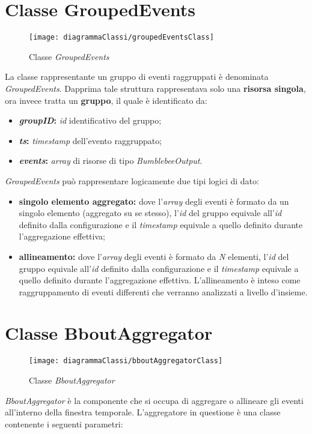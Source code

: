 \section{Classe GroupedEvents}\label{sec:ge}
\begin{figure}[H] 
    \centering 
    \texttt{[image: diagrammaClassi/groupedEventsClass]} 
    \caption{Classe \textit{GroupedEvents}}
\end{figure}
La classe rappresentante un gruppo di eventi raggruppati è denominata \textit{GroupedEvents}. Dapprima tale struttura rappresentava solo una \textbf{risorsa singola}, ora invece tratta un \textbf{gruppo}, il quale è identificato da:
\begin{itemize}
	\item{\textbf{\textit{groupID}:} \textit{id} identificativo del gruppo;}
	\item{\textbf{\textit{ts}:} \textit{\gls{timestamp}} dell'evento raggruppato;}
	\item{\textbf{\textit{events}:} \textit{array} di risorse di tipo \textit{BumblebeeOutput}.}
\end{itemize}
\textit{GroupedEvents} può rappresentare logicamente due tipi logici di dato:
\begin{itemize}
	\item{\textbf{singolo elemento aggregato:} dove l'\textit{array} degli eventi è formato da un singolo elemento (aggregato su se stesso), l'\textit{id} del gruppo equivale all'\textit{id} definito dalla configurazione e il \textit{\textit{\gls{timestamp}}} equivale a quello definito durante l'aggregazione effettiva;}
	\item{\textbf{allineamento:} dove l'\textit{array} degli eventi è formato da \textit{N} elementi, l'\textit{id} del gruppo equivale all'\textit{id} definito dalla configurazione e il \textit{\textit{\gls{timestamp}}} equivale a quello definito durante l'aggregazione effettiva. L'allineamento è inteso come raggruppamento di eventi differenti che verranno analizzati a livello d'insieme.}
\end{itemize}

\section{Classe BboutAggregator}\label{sec:aggregator}
\begin{figure}[H] 
    \centering 
    \texttt{[image: diagrammaClassi/bboutAggregatorClass]} 
    \caption{Classe \textit{BboutAggregator}}
\end{figure}
\textit{BboutAggregator} è la componente che si occupa di aggregare o allineare gli eventi all'interno della finestra temporale. L'aggregatore in questione è una classe contenente i seguenti parametri:

